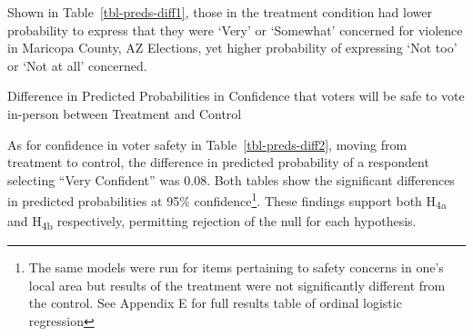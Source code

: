 \documentclass[
  12pt,
  letterpaper,
]{article}
\begin{document}
Shown in Table~\ref{tbl-preds-diff1}, those in the treatment condition
had lower probability to express that they were `Very' or `Somewhat'
concerned for violence in Maricopa County, AZ Elections, yet higher
probability of expressing `Not too' or `Not at all' concerned.

\begin{table}[H]

\caption{\label{tbl-preds-diff2}Difference in Predicted Probabilities in
Confidence that voters will be safe to vote in-person between Treatment
and Control}


\end{table}%

As for confidence in voter safety in Table~\ref{tbl-preds-diff2}, moving
from treatment to control, the difference in predicted probability of a
respondent selecting ``Very Confident'' was \(0.08\). Both tables show
the significant differences in predicted probabilities at 95\(\%\)
confidence\footnote{The same models were run for items pertaining to
  safety concerns in one's local area but results of the treatment were
  not significantly different from the control. See Appendix E for full
  results table of ordinal logistic regression}. These findings support
both H\textsubscript{4a} and H\textsubscript{4b} respectively,
permitting rejection of the null for each hypothesis.
\end{document}
